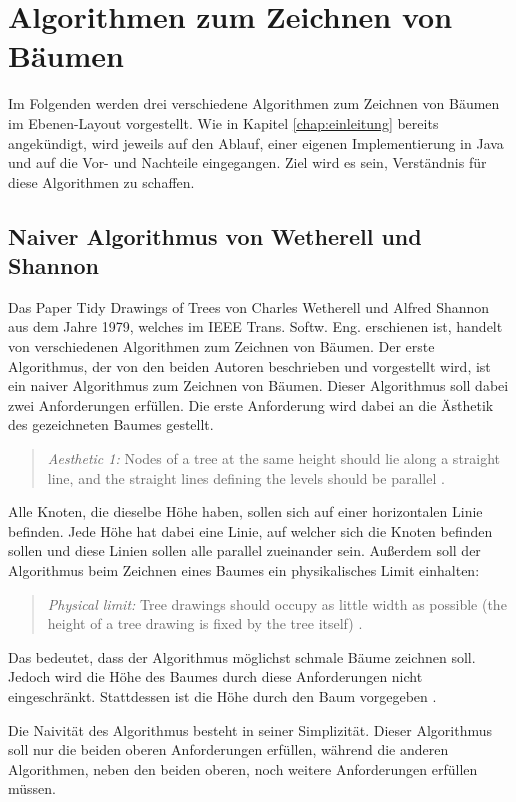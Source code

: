 \chapter{Algorithmen zum Zeichnen von Bäumen}
\label{chap:kapitel3}
Im Folgenden werden drei verschiedene Algorithmen zum Zeichnen von Bäumen im Ebenen-Layout vorgestellt. Wie in Kapitel \ref{chap:einleitung}
bereits angekündigt, wird jeweils auf den Ablauf, einer eigenen Implementierung in Java und auf die Vor- und Nachteile eingegangen. Ziel wird
es sein, Verständnis für diese Algorithmen zu schaffen.

\section{Naiver Algorithmus von Wetherell und Shannon}

Das Paper \glqq Tidy Drawings of Trees\grqq{} von Charles Wetherell und Alfred Shannon aus dem Jahre 1979, 
welches im IEEE Trans. Softw. Eng. erschienen ist, handelt von verschiedenen Algorithmen zum Zeichnen von Bäumen\cite[]{q1}.
Der erste Algorithmus, der von den beiden Autoren beschrieben und vorgestellt wird, ist ein naiver Algorithmus 
zum Zeichnen von Bäumen. Dieser Algorithmus soll dabei zwei Anforderungen erfüllen. Die erste Anforderung wird dabei
an die Ästhetik des gezeichneten Baumes gestellt. 
\begin{quotation}
	\textit{Aesthetic 1:} Nodes of a tree at the same height should lie
	along a straight line, and the straight lines defining the levels
	should be parallel \cite[S.515]{q1}.
\end{quotation}
Alle Knoten, die dieselbe Höhe haben, sollen sich auf einer horizontalen
Linie befinden. Jede Höhe hat dabei eine Linie, auf welcher sich die Knoten befinden sollen und diese Linien sollen alle
parallel zueinander sein. Außerdem soll der Algorithmus beim Zeichnen eines Baumes ein physikalisches Limit einhalten:
\begin{quotation}
	\textit{Physical limit:} Tree drawings should occupy as little width
	as possible (the height of a tree drawing is fixed by the tree
	itself) \cite[S.515]{q1}.
\end{quotation}
Das bedeutet, dass der Algorithmus möglichst schmale Bäume zeichnen soll. Jedoch wird die Höhe des Baumes durch diese Anforderungen
nicht eingeschränkt. Stattdessen ist die Höhe durch den Baum vorgegeben \cite[S.515]{q1}.

Die Naivität des Algorithmus besteht in seiner Simplizität. Dieser Algorithmus soll nur die beiden oberen Anforderungen erfüllen,
während die anderen Algorithmen, neben den beiden oberen, noch weitere Anforderungen erfüllen müssen.  

